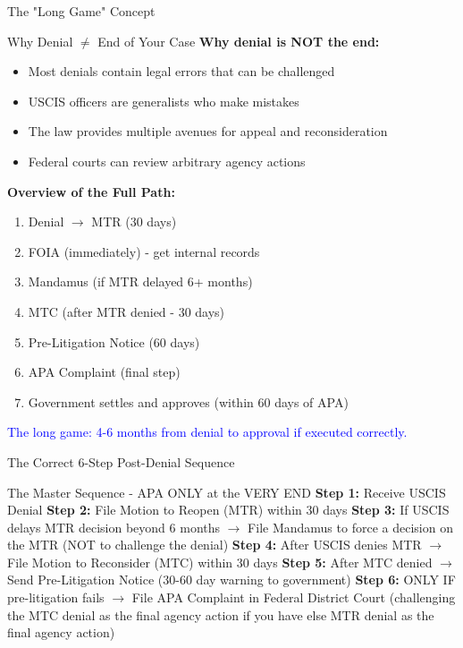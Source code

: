 \documentclass[11pt]{beamer}
\begin{document}
	\begin{frame}{The "Long Game" Concept}
		\scriptsize
		\begin{block}{Why Denial $\neq$ End of Your Case}
			\textbf{Why denial is NOT the end:}
			\begin{itemize}
				\item Most denials contain legal errors that can be challenged
				\item USCIS officers are generalists who make mistakes
				\item The law provides multiple avenues for appeal and reconsideration
				\item Federal courts can review arbitrary agency actions
			\end{itemize}
			\textbf{Overview of the Full Path:}
			\begin{enumerate}
				\item Denial $\rightarrow$ MTR (30 days)
				\item FOIA (immediately) - get internal records
				\item Mandamus (if MTR delayed 6+ months)
				\item MTC (after MTR denied - 30 days)
				\item Pre-Litigation Notice (60 days)
				\item APA Complaint (final step)
				\item Government settles and approves (within 60 days of APA)
			\end{enumerate}
			\textcolor{blue}{The long game: 4-6 months from denial to approval if executed correctly.}
		\end{block}
	\end{frame}
	
	
	\begin{frame}{The Correct 6-Step Post-Denial Sequence}
		\scriptsize
		\begin{block}{The Master Sequence - APA ONLY at the VERY END}
			\textbf{Step 1:} Receive USCIS Denial
			\vspace{0.1cm}
			\textbf{Step 2:} File Motion to Reopen (MTR) within 30 days
			\vspace{0.1cm}
			\textbf{Step 3:} If USCIS delays MTR decision beyond 6 months $\rightarrow$ File Mandamus to force a decision on the MTR (NOT to challenge the denial)
			\vspace{0.1cm}
			\textbf{Step 4:} After USCIS denies MTR $\rightarrow$ File Motion to Reconsider (MTC) within 30 days
			\vspace{0.1cm}
			\textbf{Step 5:} After MTC denied $\rightarrow$ Send Pre-Litigation Notice (30-60 day warning to government)
			\vspace{0.1cm}
			\textbf{Step 6:} ONLY IF pre-litigation fails $\rightarrow$ File APA Complaint in Federal District Court (challenging the MTC denial as the final agency action if you have else MTR denial as the final agency action)
		\end{block}
	\end{frame}
	
\end{document}
